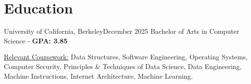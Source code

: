 \section{Education}
    \resumeSubHeadingListStart
    \resumeSubheading
    {University of California, Berkeley}{December 2025}
    {Bachelor of Arts in Computer Science - \textbf{GPA: 3.85}}{}
    \begin{itemize}[leftmargin=0.12in,label={}]
    \small{\item{
        \underline{Relevant Coursework:}{ 
            Data Structures,
            Software Engineering,
            Operating Systems,
            Computer Security,
            Principles \& Techniques of Data Science,
            Data Engineering,
            Machine Instructions,
            Internet Architecture,
            Machine Learning.
        }
    }}
    \end{itemize}
    \vspace{-5pt}  %
    \resumeSubHeadingListEnd